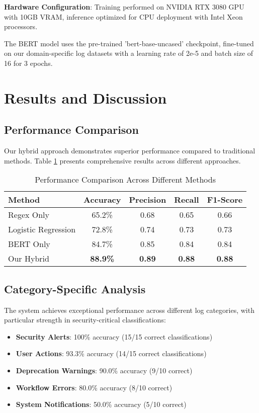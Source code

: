 \documentclass[conference]{IEEEtran}
\begin{document}
\textbf{Hardware Configuration}: Training performed on NVIDIA RTX 3080 GPU with 10GB VRAM, inference optimized for CPU deployment with Intel Xeon processors.

The BERT model uses the pre-trained 'bert-base-uncased' checkpoint, fine-tuned on our domain-specific log datasets with a learning rate of 2e-5 and batch size of 16 for 3 epochs.

\section{Results and Discussion}

\subsection{Performance Comparison}

Our hybrid approach demonstrates superior performance compared to traditional methods. Table \ref{tab:performance} presents comprehensive results across different approaches.

\begin{table}[htbp]
\caption{Performance Comparison Across Different Methods}
\begin{center}
\begin{tabular}{|l|c|c|c|c|}
\hline
\textbf{Method} & \textbf{Accuracy} & \textbf{Precision} & \textbf{Recall} & \textbf{F1-Score} \\
\hline
Regex Only & 65.2\% & 0.68 & 0.65 & 0.66 \\
\hline
Logistic Regression & 72.8\% & 0.74 & 0.73 & 0.73 \\
\hline
BERT Only & 84.7\% & 0.85 & 0.84 & 0.84 \\
\hline
Our Hybrid & \textbf{88.9\%} & \textbf{0.89} & \textbf{0.88} & \textbf{0.88} \\
\hline
\end{tabular}
\label{tab:performance}
\end{center}
\end{table}

\subsection{Category-Specific Analysis}

The system achieves exceptional performance across different log categories, with particular strength in security-critical classifications:

\begin{itemize}
\item \textbf{Security Alerts}: 100\% accuracy (15/15 correct classifications)
\item \textbf{User Actions}: 93.3\% accuracy (14/15 correct classifications)
\item \textbf{Deprecation Warnings}: 90.0\% accuracy (9/10 correct)
\item \textbf{Workflow Errors}: 80.0\% accuracy (8/10 correct)
\item \textbf{System Notifications}: 50.0\% accuracy (5/10 correct)
\end{itemize}
\end{document}
